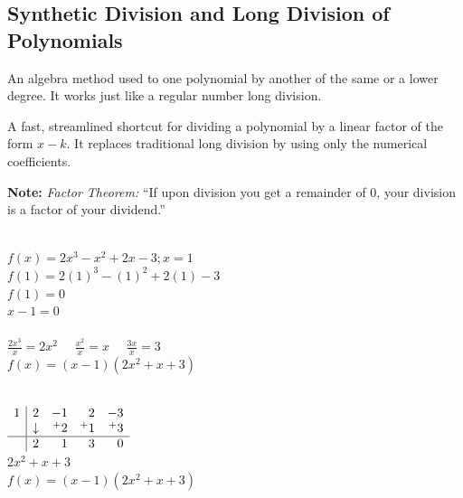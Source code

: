 \subsection{Synthetic Division and Long Division of Polynomials}

\begin{definition}
  An algebra method used to one polynomial by another of the same or a lower degree. It works just like a regular number long division.
\end{definition}

\begin{definition}
  A fast, streamlined shortcut for dividing a polynomial by a linear factor of the form $x - k$. It replaces traditional long division by using only the numerical coefficients.
\end{definition}

\textbf{Note: } \textit{Factor Theorem:} ``If upon division you get a remainder of $0$, your division is a factor of your dividend.''

\begin{example}
  \hfill \\
  $f(x) = 2x^3 - x^2 + 2x - 3 ; x = 1$ \\
  $f(1) = 2(1)^3 - (1)^2 + 2(1) - 3 $ \\
  $f(1) = 0$ \\
  $x - 1 = 0$ \\
   \\
  $\frac{2x^3}{x} = 2x^2 \quad$
  $\frac{x^2}{x} = x \quad$
  $\frac{3x}{x} = 3$ \\
  $f(x) = (x - 1)(2x^2 + x + 3)$
\end{example}

\begin{example}
  \hfill \\
  $
  \begin{array}{c|rrrr}
    1 & 2 & -1 & 2 & -3 \\
    & \downarrow & ^+2 & ^+1 & ^+3 \\
    \hline
    & 2 & 1 & 3 & 0 
  \end{array}
  $ \\
  $2x^2 + x + 3$ \\
  $f(x) = (x - 1)(2x^2 + x + 3)$ \\
\end{example}

